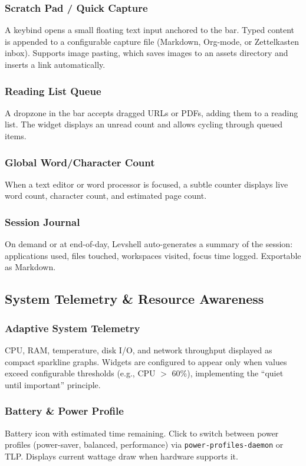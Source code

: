 \documentclass[11pt,a4paper]{article}
\begin{document}
\subsubsection{Scratch Pad / Quick Capture}
A keybind opens a small floating text input anchored to the bar. Typed content is appended to a configurable capture file (Markdown, Org-mode, or Zettelkasten inbox). Supports image pasting, which saves images to an assets directory and inserts a link automatically.

\subsubsection{Reading List Queue}
A dropzone in the bar accepts dragged URLs or PDFs, adding them to a reading list. The widget displays an unread count and allows cycling through queued items.

\subsubsection{Global Word/Character Count}
When a text editor or word processor is focused, a subtle counter displays live word count, character count, and estimated page count.

\subsubsection{Session Journal}
On demand or at end-of-day, Levshell auto-generates a summary of the session: applications used, files touched, workspaces visited, focus time logged. Exportable as Markdown.


\subsection{System Telemetry \& Resource Awareness}
\label{sec:features-telemetry}

\subsubsection{Adaptive System Telemetry}
CPU, RAM, temperature, disk I/O, and network throughput displayed as compact sparkline graphs. Widgets are configured to appear only when values exceed configurable thresholds (e.g., CPU $>$ 60\%), implementing the ``quiet until important'' principle.

\subsubsection{Battery \& Power Profile}
Battery icon with estimated time remaining. Click to switch between power profiles (power-saver, balanced, performance) via \texttt{power-profiles-daemon} or TLP. Displays current wattage draw when hardware supports it.
\end{document}
